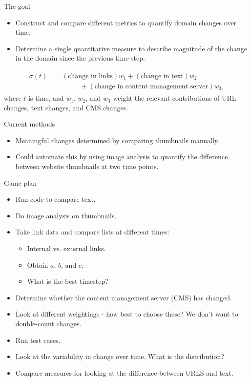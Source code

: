 \documentclass[10pt]{beamer}
\begin{document}
\begin{frame}[fragile]{The goal}

\begin{itemize}
	\item Construct and compare different metrics to quantify domain changes over time,
	\item Determine a single quantitative measure to describe magnitude of the change in the domain since the previous time-step.
	\end{itemize} 
\begin{align}
	\begin{split}
		\sigma(t) &= (\text{change in links})w_1 + (\text{change in text})w_2 \\
		&\qquad\qquad+ (\text{change in content management server})w_3,
	\end{split}
\end{align}
where $t$ is time, and $w_1$, $w_2$, and $w_3$ weight the relevant contributions of URL changes, text changes, and CMS changes.
\end{frame}

\begin{frame}{Current methods}
 
\begin{itemize}
	\item Meaningful changes determined by comparing thumbnails manually. 
	\vspace{3ex}
	\item Could automate this by using image analysis to quantify the difference between website thumbnails at two time points. 
\end{itemize}
\end{frame}

\begin{frame}{Game plan}
\begin{itemize}
\item Run code to compare text.
\item Do image analysis on thumbnails.
\item Take link data and compare lists at different times:
\begin{itemize}
\item Internal vs. external links.
\item Obtain $a$, $b$, and $c$. 
\item What is the best timestep?
\end{itemize}
\item Determine whether the content management server (CMS) has changed.
\item Look at different weightings - how best to choose these? We don't want to double-count changes.
\item Run test cases.
\item Look at the variability in change over time. What is the distribution?
\item Compare measures for looking at the difference between URLS and text.
\end{itemize}

\end{frame}
\end{document}
